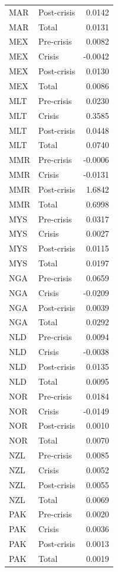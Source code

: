\begin{longtable}[t]{llr}
MAR & Post-crisis & 0.0142\\
MAR & Total & 0.0131\\
MEX & Pre-crisis & 0.0082\\
MEX & Crisis & -0.0042\\
\addlinespace
MEX & Post-crisis & 0.0130\\
MEX & Total & 0.0086\\
MLT & Pre-crisis & 0.0230\\
MLT & Crisis & 0.3585\\
MLT & Post-crisis & 0.0448\\
\addlinespace
MLT & Total & 0.0740\\
MMR & Pre-crisis & -0.0006\\
MMR & Crisis & -0.0131\\
MMR & Post-crisis & 1.6842\\
MMR & Total & 0.6998\\
\addlinespace
MYS & Pre-crisis & 0.0317\\
MYS & Crisis & 0.0027\\
MYS & Post-crisis & 0.0115\\
MYS & Total & 0.0197\\
NGA & Pre-crisis & 0.0659\\
\addlinespace
NGA & Crisis & -0.0209\\
NGA & Post-crisis & 0.0039\\
NGA & Total & 0.0292\\
NLD & Pre-crisis & 0.0094\\
NLD & Crisis & -0.0038\\
\addlinespace
NLD & Post-crisis & 0.0135\\
NLD & Total & 0.0095\\
NOR & Pre-crisis & 0.0184\\
NOR & Crisis & -0.0149\\
NOR & Post-crisis & 0.0010\\
\addlinespace
NOR & Total & 0.0070\\
NZL & Pre-crisis & 0.0085\\
NZL & Crisis & 0.0052\\
NZL & Post-crisis & 0.0055\\
NZL & Total & 0.0069\\
\addlinespace
PAK & Pre-crisis & 0.0020\\
PAK & Crisis & 0.0036\\
PAK & Post-crisis & 0.0013\\
PAK & Total & 0.0019\\

\end{longtable}

